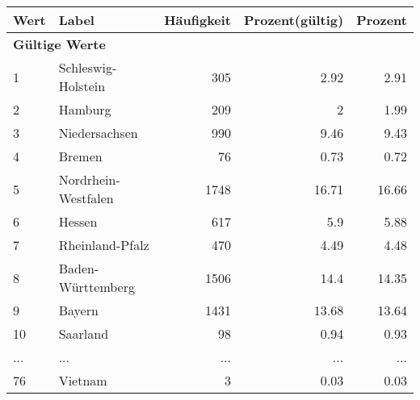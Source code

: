      \begin{longtable}{lXrrr}
     \toprule
     \textbf{Wert} & \textbf{Label} & \textbf{Häufigkeit} & \textbf{Prozent(gültig)} & \textbf{Prozent} \\
     \endhead
     \midrule
     \multicolumn{5}{l}{\textbf{Gültige Werte}}\\
        1 & \multicolumn{1}{X}{Schleswig-Holstein} & %
          \num{305} &
          \num[round-mode=places,round-precision=2]{2,92} &
          \num[round-mode=places,round-precision=2]{2,91} \\
        2 & \multicolumn{1}{X}{Hamburg} & %
          \num{209} &
          \num[round-mode=places,round-precision=2]{2} &
          \num[round-mode=places,round-precision=2]{1,99} \\
        3 & \multicolumn{1}{X}{Niedersachsen} & %
          \num{990} &
          \num[round-mode=places,round-precision=2]{9,46} &
          \num[round-mode=places,round-precision=2]{9,43} \\
        4 & \multicolumn{1}{X}{Bremen} & %
          \num{76} &
          \num[round-mode=places,round-precision=2]{0,73} &
          \num[round-mode=places,round-precision=2]{0,72} \\
        5 & \multicolumn{1}{X}{Nordrhein-Westfalen} & %
          \num{1748} &
          \num[round-mode=places,round-precision=2]{16,71} &
          \num[round-mode=places,round-precision=2]{16,66} \\
        6 & \multicolumn{1}{X}{Hessen} & %
          \num{617} &
          \num[round-mode=places,round-precision=2]{5,9} &
          \num[round-mode=places,round-precision=2]{5,88} \\
        7 & \multicolumn{1}{X}{Rheinland-Pfalz} & %
          \num{470} &
          \num[round-mode=places,round-precision=2]{4,49} &
          \num[round-mode=places,round-precision=2]{4,48} \\
        8 & \multicolumn{1}{X}{Baden-Württemberg} & %
          \num{1506} &
          \num[round-mode=places,round-precision=2]{14,4} &
          \num[round-mode=places,round-precision=2]{14,35} \\
        9 & \multicolumn{1}{X}{Bayern} & %
          \num{1431} &
          \num[round-mode=places,round-precision=2]{13,68} &
          \num[round-mode=places,round-precision=2]{13,64} \\
        10 & \multicolumn{1}{X}{Saarland} & %
          \num{98} &
          \num[round-mode=places,round-precision=2]{0,94} &
          \num[round-mode=places,round-precision=2]{0,93} \\
       ... & ... & ... & ... & ... \\
        76 & \multicolumn{1}{X}{Vietnam} & %
          \num{3} &
          \num[round-mode=places,round-precision=2]{0,03} &
          \num[round-mode=places,round-precision=2]{0,03} \\


\end{longtable}
